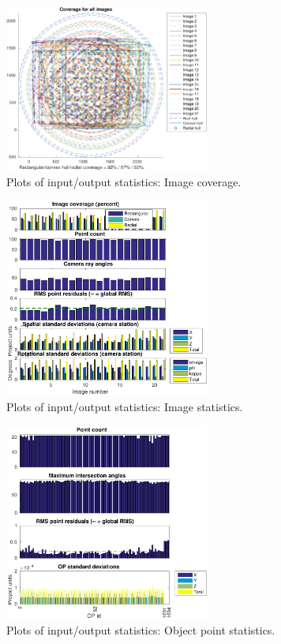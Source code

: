 \documentclass{article}
\begin{document}
\begin{figure}[tbp]
\centering
\includegraphics[width=0.6\textwidth]{./ill/ccamcoverage.pdf}
\caption{\label{fig:ccamCoverage}
Plots of input/output statistics: Image coverage.}
\end{figure}

\begin{figure}[tbp]
\centering
\includegraphics[width=0.6\textwidth]{./ill/ccamimstats.pdf}
\caption{\label{fig:ccamImstats}
Plots of input/output statistics: Image statistics.}
\end{figure}

\begin{figure}[tbp]
\centering
\includegraphics[width=0.6\textwidth]{./ill/ccamopstats.pdf}
\caption{\label{fig:ccamOPstats}
Plots of input/output statistics: Object point statistics.}
\end{figure}
\end{document}
